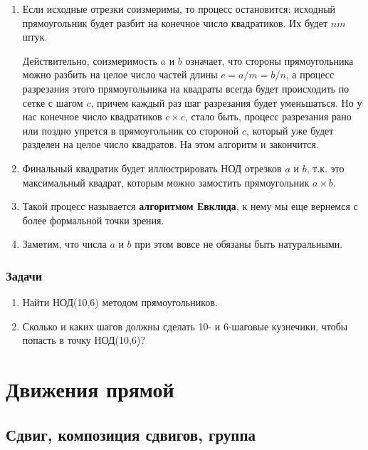 \begin{enumerate}
\item Если исходные отрезки соизмеримы, то процесс остановится: исходный прямоугольник будет разбит на конечное число квадратиков. Их будет $nm$ штук.

Действительно, соизмеримость $a$ и $b$ означает, что стороны прямоугольника можно разбить на целое число частей длины $c=a/m=b/n$, а процесс разрезания этого прямоугольника на квадраты всегда будет происходить по сетке с шагом $c$, причем каждый раз шаг разрезания будет уменьшаться. Но у нас конечное число квадратиков $c\times c$, стало быть, процесс разрезания рано или поздно упрется в прямоугольник со стороной $c$, который уже будет разделен на целое число квадратов. На этом алгоритм и закончится.

\item Финальный квадратик будет иллюстрировать НОД отрезков $a$ и $b$, т.к. это максимальный квадрат, которым можно замостить прямоугольник $a\times b$.
\item Такой процесс называется \textbf{алгоритмом Евклида}, к нему мы еще вернемся с более формальной точки зрения.
\item Заметим, что числа $a$ и $b$ при этом вовсе не обязаны быть натуральными.
\end{enumerate}
\subsection*{Задачи}
\begin{enumerate}
\item Найти НОД(10,6) методом прямоугольников.
\item Сколько и каких шагов должны сделать 10- и 6-шаговые кузнечики, чтобы попасть в точку НОД(10,6)?
\end{enumerate}



\chapter{Движения прямой}


\section{Сдвиг, композиция сдвигов, группа}


